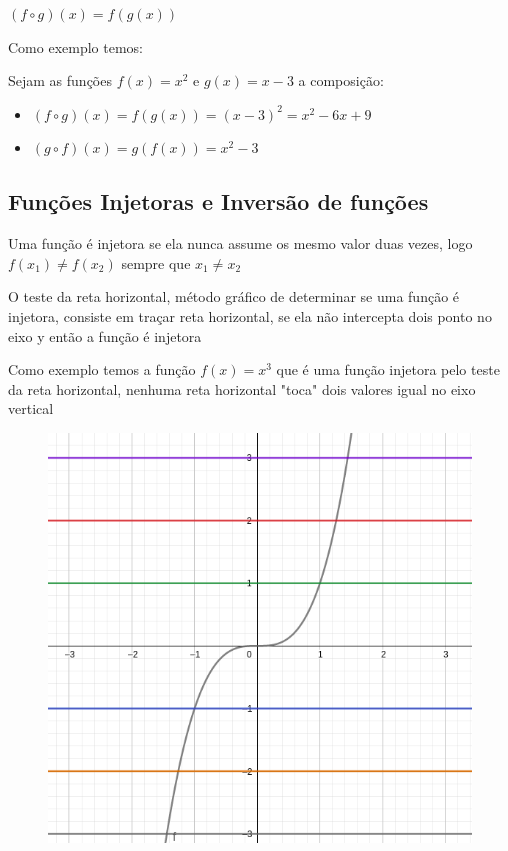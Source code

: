 \begin{multicols*}{2}
\begin{theorem}
        $(f \circ g)(x) = f(g(x))$
    \end{theorem}
    Como exemplo temos:

    Sejam as funções $f(x) = x^2$ e $g(x) = x -3 $ a composição:
    \begin{itemize}
        \item $(f \circ g)(x) = f(g(x)) = (x-3)^2 = x^2 -6x + 9$
        \item $(g \circ f)(x) = g(f(x)) = x^2 - 3$
    \end{itemize}

    \subsection*{Funções Injetoras e Inversão de funções}
    Uma função é injetora se ela nunca assume os mesmo valor duas vezes, logo $f(x_1) \ne f(x_2)$ 			sempre que $x_1 \ne x_2$

    \begin{theorem}
        O teste da reta horizontal, método gráfico de determinar se uma função é injetora, consiste em 			traçar reta horizontal, se ela não intercepta dois ponto no eixo y então a função é injetora
    \end{theorem}

    Como exemplo temos a função $f(x) = x^3$ que é uma função injetora pelo teste da reta 					horizontal, nenhuma reta horizontal "toca" dois valores igual no eixo vertical
    \begin{figure}[H]
        \centering
        \includegraphics[scale=0.3]{assets/rafael/img37.png}
    \end{figure}


\end{multicols*}

